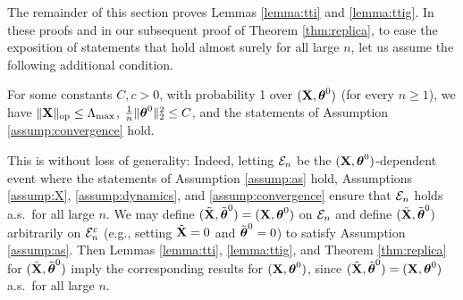 The remainder of this section proves Lemmas \ref{lemma:tti}
and \ref{lemma:ttig}. In these proofs and in our subsequent proof of Theorem
\ref{thm:replica}, to ease the exposition of statements that hold almost
surely for all large $n$, let us assume the following additional condition.
\begin{assumption}\label{assump:as}
For some constants $C,c>0$, with probability 1 over $(\mathbf{X},\boldsymbol{\theta}^0)$
(for every $n \geq 1$), we have
$\|\mathbf{X}\|_{\mathrm{op}} \leq \Lambda_{\max}$, $\frac{1}{n}\|\boldsymbol{\theta}^0\|_2^2 \leq C$,
and the statements of Assumption \ref{assump:convergence} hold.
\end{assumption}
This is without loss of generality: Indeed, letting $\mathcal{E}_n$ be the
$(\mathbf{X},\boldsymbol{\theta}^0)$-dependent event where the statements of Assumption
\ref{assump:as} hold, Assumptions \ref{assump:X}, \ref{assump:dynamics}, and
\ref{assump:convergence} ensure that $\mathcal{E}_n$ holds a.s.\ for all large $n$.
We may define $(\tilde {\mathbf{X}},\tilde {\boldsymbol{\theta}}^0)=(\mathbf{X},\boldsymbol{\theta}^0)$ on $\mathcal{E}_n$ and
define $(\tilde {\mathbf{X}},\tilde {\boldsymbol{\theta}}^0)$ arbitrarily on $\mathcal{E}_n^c$ (e.g., setting $\tilde {\mathbf{X}}=0$ and $\tilde{\boldsymbol{\theta}}^0=0$) to satisfy
Assumption \ref{assump:as}. Then Lemmas \ref{lemma:tti},
\ref{lemma:ttig}, and Theorem \ref{thm:replica} for $(\tilde {\mathbf{X}},\tilde
{\boldsymbol{\theta}}^0)$ imply the corresponding results for $(\mathbf{X},\boldsymbol{\theta}^0)$, since
$(\tilde {\mathbf{X}},\tilde {\boldsymbol{\theta}}^0)=(\mathbf{X},\boldsymbol{\theta}^0)$ a.s.\ for all large $n$.

